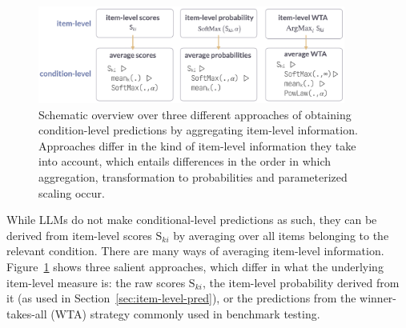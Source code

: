 \documentclass[fleqn]{article}
\begin{document}
\begin{figure}
  \centering
  \includegraphics[width=0.9\textwidth]{00-pics/measures-overview.png}
  \caption{
    Schematic overview over three different approaches of obtaining condition-level predictions by aggregating item-level information.
    Approaches differ in the kind of item-level information they take into account, which entails differences in the order in which aggregation, transformation to probabilities and parameterized scaling occur.
  }
  \label{fig:measures-overview}
\end{figure}

While LLMs do not make conditional-level predictions as such, they can be derived from item-level scores $\text{S}_{ki}$ by averaging over all items belonging to the relevant condition.
There are many ways of averaging item-level information.
Figure~\ref{fig:measures-overview} shows three salient approaches, which differ in what the underlying item-level measure is: the raw scores $\text{S}_{ki}$, the item-level probability derived from it (as used in Section~\ref{sec:item-level-pred}), or the predictions from the winner-takes-all (WTA) strategy commonly used in benchmark testing.

\end{document}
